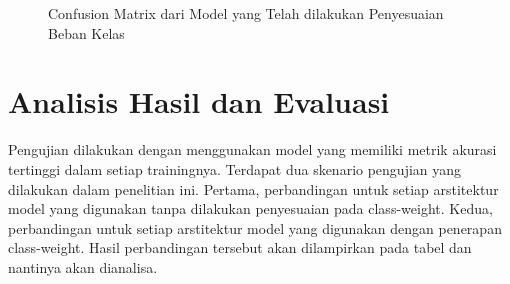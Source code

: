\begin{figure}
	\centering
	\qquad
	\qquad
	\caption{Confusion Matrix dari Model yang Telah dilakukan Penyesuaian Beban Kelas}%
	\label{fig:confRes152Class}
\end{figure}

\section{Analisis Hasil dan Evaluasi}
\label{sec:42}

Pengujian dilakukan dengan menggunakan model yang memiliki metrik akurasi tertinggi dalam setiap trainingnya. Terdapat dua skenario pengujian yang dilakukan dalam penelitian ini. Pertama, perbandingan untuk setiap arstitektur model yang digunakan tanpa dilakukan penyesuaian pada class-weight. Kedua, perbandingan untuk setiap arstitektur model yang digunakan dengan penerapan class-weight. Hasil perbandingan tersebut akan dilampirkan pada tabel dan nantinya akan dianalisa.